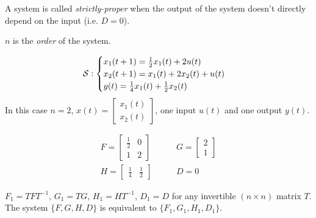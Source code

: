 \begin{definition} 
A system is called \emph{strictly-proper} when the output of the system doesn't directly depend on the input (i.e. $D=0$). 
\end{definition}

\begin{obs}
$n$ is the \emph{order} of the system.
\end{obs}

\begin{example}[SISO system of order $n=2$]
    \[
    \mathcal{S}: 
        \begin{cases}
            x_1(t+1) = \frac{1}{2} x_1(t) + 2u(t) \\
            x_2(t+1) = x_1(t) + 2x_2(t) + u(t) \\
            y(t) = \frac{1}{4}x_1(t) + \frac{1}{2}x_2(t)
        \end{cases}
    \]
    In this case $n=2$, $x(t) = \begin{bmatrix}
        x_1(t) \\
        x_2(t)
    \end{bmatrix}$, one input $u(t)$ and one output $y(t)$.

    \begin{align*}
        F = \begin{bmatrix}
            \frac{1}{2} & 0 \\
            1 & 2
        \end{bmatrix}
        & \qquad
        G = \begin{bmatrix}
            2 \\ 1
        \end{bmatrix}
        \\
        H = \begin{bmatrix}
            \frac{1}{4} & \frac{1}{2}
        \end{bmatrix}
        & \qquad
        D = 0
    \end{align*}
\end{example}


\begin{remark}
    $F_1 = TFT^{-1}$, $G_1 = TG$, $H_1 = HT^{-1}$, $D_1 = D$ for any invertible $(n\times n)$ matrix $T$. The system $\{F, G, H, D\}$ is equivalent to $\{F_1, G_1, H_1, D_1\}$.
\end{remark}